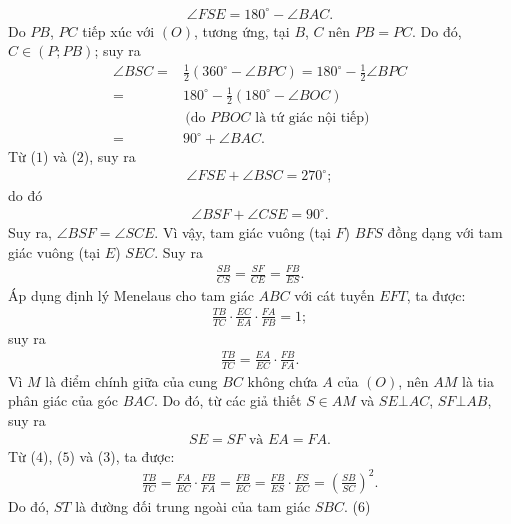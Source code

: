\begin{multicols}{2}
	\begin{align*}
		\angle FSE = {180^{\circ}} - \angle BAC. \tag{$1$}
	\end{align*}
	Do $PB$, $PC$ tiếp xúc với $(O)$, tương ứng, tại $B$, $C$ nên $PB = PC$. Do đó, $C \in (P; PB)$; suy ra
	\begin{align*}
		\angle BSC = &\frac{1}{2}\!\left({{{360}^{\circ}} \!-\! \angle BPC} \right) \!=\! {180^{\circ}} \!-\! \frac{1}{2}\angle BPC\\
		= \,&{180^{\circ}} - \frac{1}{2}\left( {{{180}^{\circ}} - \angle BOC} \right)\\
		&\,\text{(do $PBOC$ là tứ giác nội tiếp)}\\
		= \,&{90^{\circ}} + \angle BAC. \tag{$2$}
	\end{align*}
	Từ ($1$) và ($2$), suy ra
	\begin{align*}
		\angle FSE + \angle BSC = {270^{\circ}};
	\end{align*}
	do đó
	\begin{align*}
		\angle BSF + \angle CSE = {90^{\circ}}.
	\end{align*}
	Suy ra,  $\angle BSF = \angle SCE$. Vì vậy, tam giác vuông (tại $F$) $BFS$ đồng dạng với tam giác vuông (tại $E$) $SEC$. Suy ra
	\begin{align*}
		\frac{{SB}}{{CS}} = \frac{{SF}}{{CE}} = \frac{{FB}}{{ES}}. \tag{$3$}
	\end{align*}
	Áp dụng định lý Menelaus cho tam giác $ABC$ với cát tuyến $EFT$, ta được:
	\begin{align*}
		\frac{{TB}}{{TC}} \cdot \frac{{EC}}{{EA}} \cdot \frac{{FA}}{{FB}} = 1;
	\end{align*}
	suy ra
	\begin{align*}
		\frac{{TB}}{{TC}} = \frac{{EA}}{{EC}} \cdot \frac{{FB}}{{FA}}. \tag{$4$}
	\end{align*}
	Vì $M$ là điểm chính giữa của cung $BC$ không chứa $A$ của $(O)$, nên $AM$ là tia phân giác của góc $BAC$. Do đó, từ các giả thiết $S \in AM$ và $SE \bot AC$, $SF \bot AB$, suy ra
	\begin{align*}
		SE = SF \text{ và } EA = FA.  \tag{$5$}
	\end{align*} 
	Từ ($4$), ($5$) và ($3$), ta được:
	\begin{align*}
		\frac{{TB}}{{TC}} \!=\! \frac{{FA}}{{EC}} \!\cdot\! \frac{{FB}}{{FA}} \!=\! \frac{{FB}}{{EC}} \!=\! \frac{{FB}}{{ES}} \!\cdot\! \frac{{FS}}{{EC}} \!=\! {\left( {\frac{{SB}}{{SC}}} \right)^2}.
	\end{align*}
	Do đó, $ST$ là đường đối trung ngoài của tam giác $SBC$. \hfill ($6$)

\end{multicols}
